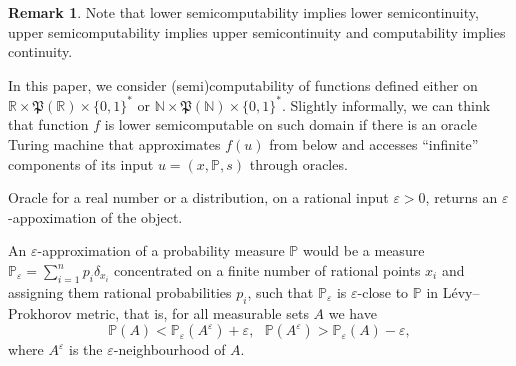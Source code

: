 \documentclass{article}
\theoremstyle{definition}
\newtheorem*{remark}{Remark}
\theoremstyle{definition}
\newtheorem{definition}{Definition}[section]
\newcommand{\natnums}{\mathbb{N}}
\newcommand{\intnums}{\mathbb{Z}}
\newcommand{\ratnums}{\mathbb{Q}}
\newcommand{\reals}{\mathbb{R}}
\newcommand{\probP}{\mathbb{P}}
\newcommand{\adomain}{\mathbf{D}}
\begin{document}
\begin{remark}
    Note that lower semicomputability implies lower semicontinuity, upper semicomputability implies upper semicontinuity and computability implies continuity.
\end{remark}

In this paper, we consider (semi)computability of functions defined either on $\reals \times \mathfrak{P}(\reals)\times\{0,1\}^*$ or $\natnums \times \mathfrak{P}(\natnums)\times\{0,1\}^*$. Slightly informally, we can think that function $f$ is lower semicomputable on such domain if there is an oracle Turing machine that approximates $f(u)$ from below and accesses ``infinite'' components of its input $u=(x,\probP,s)$ through oracles. 

Oracle for a real number or a distribution, on a rational input $\varepsilon >0$, returns an $\varepsilon$-appoximation of the object.

An $\varepsilon$-approximation of a probability measure $\probP$ would be a measure $\probP_\varepsilon=\sum_{i=1}^n p_i \delta_{x_i}$ concentrated on a finite number of rational points $x_i$ and assigning them rational probabilities $p_i$, such that $\probP_{\varepsilon}$ is $\varepsilon$-close to $\probP$ in L\'evy–Prokhorov metric, that is, for all measurable sets $A$ we have
\[
    \probP(A) < \probP_\varepsilon(A^\varepsilon) + \varepsilon,~~~ \probP(A^\varepsilon) > \probP_\varepsilon(A) - \varepsilon,
\]
where $A^\varepsilon$ is the $\varepsilon$-neighbourhood of $A$.



\end{document}

